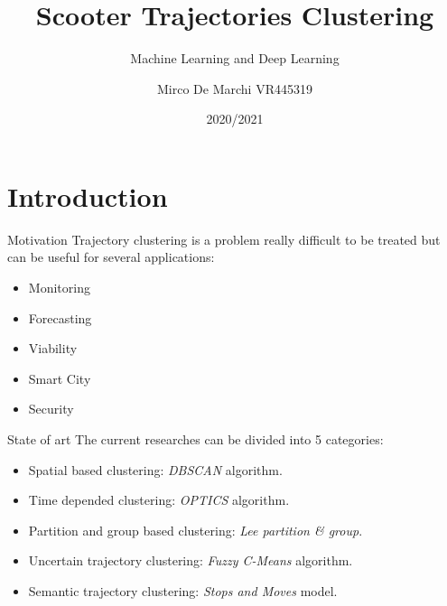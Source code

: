 \documentclass{beamer}
\title{Scooter Trajectories Clustering}
\subtitle{Machine Learning and Deep Learning}
\author{Mirco De Marchi VR445319}
\institute{University of Verona}
\date{2020/2021}
\begin{document}
\begin{frame}
\maketitle
\end{frame}


\section{Introduction}

\begin{frame}{Motivation}
 Trajectory clustering is a problem really difficult to be treated but can be useful for several applications:
 \begin{itemize}
 	\item Monitoring
 	\item Forecasting
 	\item Viability
 	\item Smart City
 	\item Security
 \end{itemize}
\end{frame}

\begin{frame}{State of art}
The current researches can be divided into 5 categories:
\begin{itemize}
	\item Spatial based clustering: \textit{DBSCAN} algorithm.
	\item Time depended clustering: \textit{OPTICS} algorithm.
	\item Partition and group based clustering: \textit{Lee partition \& group}.
	\item Uncertain trajectory clustering: \textit{Fuzzy C-Means} algorithm.
	\item Semantic trajectory clustering: \textit{Stops and Moves} model.
\end{itemize}
\end{frame}
\end{document}

